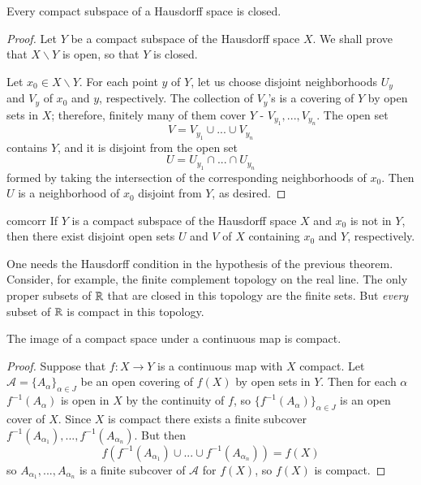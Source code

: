 \documentclass[12pt, a4paper, oneside, openright, titlepage]{book}
\begin{document}
\begin{theorem}
    Every compact subspace of a Hausdorff space is closed.
\end{theorem}
\begin{proof}
    Let $Y$ be a compact subspace of the Hausdorff space $X$. We shall prove that $X\backslash Y$ is open, so that $Y$ is closed.

    Let $x_0 \in X\backslash Y$. For each point $y$ of $Y$, let us choose disjoint neighborhoods $U_y$ and $V_y$ of $x_0$ and $y$, respectively. The collection of $V_y$'s is a covering of $Y$ by open sets in $X$; therefore, finitely many of them cover $Y$ - $V_{y_1},...,V_{y_n}$. The open set \begin{equation*}
        V = V_{y_1}\cup...\cup V_{y_n}
    \end{equation*}
    contains $Y$, and it is disjoint from the open set \begin{equation*}
        U = U_{y_1}\cap ...\cap U_{y_n}
    \end{equation*}
    formed by taking the intersection of the corresponding neighborhoods of $x_0$. Then $U$ is a neighborhood of $x_0$ disjoint from $Y$, as desired.
\end{proof}

\begin{corollary}{}{comcorr}
    If $Y$ is a compact subspace of the Hausdorff space $X$ and $x_0$ is not in $Y$, then there exist disjoint open sets $U$ and $V$ of $X$ containing $x_0$ and $Y$, respectively.
\end{corollary}

\begin{example}
    One needs the Hausdorff condition in the hypothesis of the previous theorem. Consider, for example, the finite complement topology on the real line. The only proper subsets of $\mathbb R$ that are closed in this topology are the finite sets. But \emph{every} subset of $\mathbb R$ is compact in this topology.
\end{example}

\begin{theorem}
    The image of a compact space under a continuous map is compact.
\end{theorem}
\begin{proof}
    Suppose that $f:X\rightarrow Y$ is a continuous map with $X$ compact. Let $\mathcal{A} = \{A_{\alpha}\}_{\alpha \in J}$ be an open covering of $f(X)$ by open sets in $Y$. Then for each $\alpha$ $f^{-1}(A_{\alpha})$ is open in $X$ by the continuity of $f$, so $\{f^{-1}(A_{\alpha})\}_{\alpha \in J}$ is an open cover of $X$. Since $X$ is compact there exists a finite subcover $f^{-1}(A_{\alpha_1}),...,f^{-1}(A_{\alpha_n})$. But then $$f(f^{-1}(A_{\alpha_1})\cup...\cup f^{-1}(A_{\alpha_n})) = f(X)$$ so $A_{\alpha_1},...,A_{\alpha_n}$ is a finite subcover of $\mathcal{A}$ for $f(X)$, so $f(X)$ is compact.
\end{proof}
\end{document}
